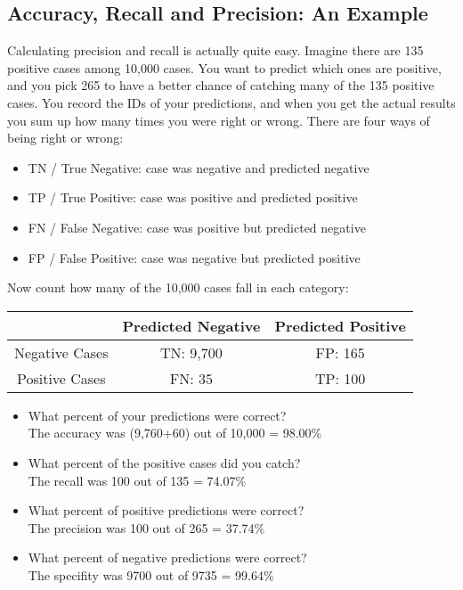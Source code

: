 \documentclass[a4paper,12pt]{article}
\begin{document}
\subsection*{Accuracy, Recall and Precision: An Example}
Calculating precision and recall is actually quite easy. Imagine there are
135 positive cases among 10,000 cases. You want to predict which ones are
positive, and you pick 265 to have a better chance of catching many of the
135 positive cases. You record the IDs of your predictions, and when you
get the actual results you sum up how many times you were right or wrong.
There are four ways of being right or wrong:
\begin{itemize}
	\item TN / True Negative: case was negative and predicted negative
	\item TP / True Positive: case was positive and predicted positive
	\item  FN / False Negative: case was positive but predicted negative
	\item FP / False Positive: case was negative but predicted positive
\end{itemize}
Now count how many of the 10,000 cases fall in each category:
\begin{center}
	\begin{tabular}{|c|c|c|} \hline
		& Predicted Negative & Predicted Positive \\ \hline
		Negative Cases & TN: 9,700 & FP: 165 \\ \hline
		Positive Cases &  FN: 35 & TP: 100 \\ \hline
	\end{tabular}
\end{center}

\begin{itemize}
	\item What percent of your predictions were correct? \\The accuracy was (9,760+60) out of 10,000 = 98.00\%
	\item	What percent of the positive cases did you catch?\\
	The recall was 100 out of 135 = 74.07\%
	\item	What percent of positive predictions were correct?\\
	The precision was 100 out of 265 = 37.74\%
	\item 	What percent of negative predictions were correct?\\
	The specifity was 9700 out of 9735 = 99.64\%
\end{itemize}
\end{document}
